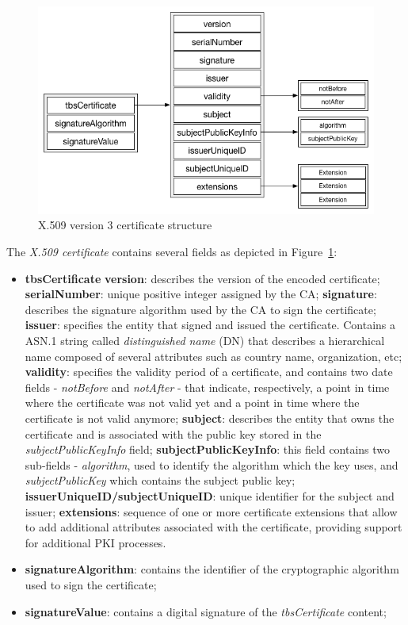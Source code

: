\begin{figure}
    \includegraphics[width=\linewidth]{Figures/x509-certificate.png}
    \caption{X.509 version 3 certificate structure}
    \label{fig:x509-certificate}
\end{figure}

The \textit{X.509 certificate} contains several fields as depicted in Figure~\ref{fig:x509-certificate}:

\begin{itemize}
	\item \textbf{tbsCertificate}
		\subitem \textbf{version}: describes the version of the encoded certificate;
		\subitem \textbf{serialNumber}: unique positive integer assigned by the \ac{CA};
		\subitem \textbf{signature}: describes the signature algorithm used by the \ac{CA} to sign the certificate;
		\subitem \textbf{issuer}: specifies the entity that signed and issued the certificate. Contains a ASN.1 string called \textit{distinguished name} (DN) that describes a hierarchical name composed of several attributes such as country name, organization, etc;
		\subitem \textbf{validity}: specifies the validity period of a certificate, and contains two date fields - \textit{notBefore} and \textit{notAfter} - that indicate, respectively, a point in time where the certificate was not valid yet and a point in time where the certificate is not valid anymore;
		\subitem \textbf{subject}: describes the entity that owns the certificate and is associated with the public key stored in the \textit{subjectPublicKeyInfo} field;
		\subitem \textbf{subjectPublicKeyInfo}: this field contains two sub-fields - \textit{algorithm}, used to identify the algorithm which the key uses, and \textit{subjectPublicKey} which contains the subject public key;
		\subitem \textbf{issuerUniqueID/subjectUniqueID}: unique identifier for the subject and issuer;
		\subitem \textbf{extensions}: sequence of one or more certificate extensions that allow to add additional attributes associated with the certificate, providing support for additional \ac{PKI} processes.
	\item \textbf{signatureAlgorithm}: contains the identifier of the cryptographic algorithm used to sign the certificate;
	\item \textbf{signatureValue}: contains a digital signature of the \textit{tbsCertificate} content;
\end{itemize}

